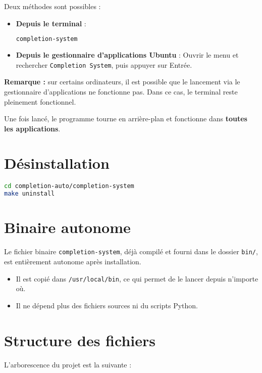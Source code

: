 \documentclass[11pt,a4paper]{article}
\begin{document}
Deux méthodes sont possibles :

\begin{itemize}
	\item \textbf{Depuis le terminal} :
	      \begin{lstlisting}[language=bash]
completion-system
  \end{lstlisting}

	\item \textbf{Depuis le gestionnaire d'applications Ubuntu} :
	      Ouvrir le menu et rechercher \texttt{Completion System}, puis appuyer sur Entrée.
\end{itemize}

\textbf{Remarque :} sur certains ordinateurs, il est possible que le lancement via le gestionnaire d’applications ne fonctionne pas. Dans ce cas, le terminal reste pleinement fonctionnel.

Une fois lancé, le programme tourne en arrière-plan et fonctionne dans \textbf{toutes les applications}.

\section*{Désinstallation}

\begin{lstlisting}[language=bash]
cd completion-auto/completion-system
make uninstall
\end{lstlisting}

\section*{Binaire autonome}

Le fichier binaire \texttt{completion-system}, déjà compilé et fourni dans le dossier \texttt{bin/}, est entièrement autonome après installation.

\begin{itemize}
	\item Il est copié dans \texttt{/usr/local/bin}, ce qui permet de le lancer depuis n'importe où.
	\item Il ne dépend plus des fichiers sources ni du scripts Python.
\end{itemize}

\section*{Structure des fichiers}

L'arborescence du projet est la suivante :
\end{document}
